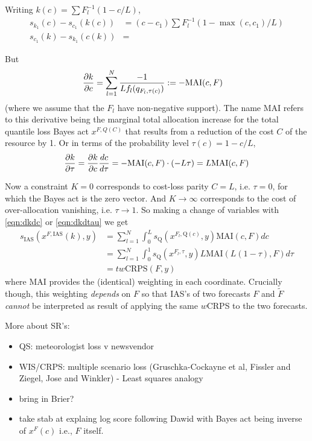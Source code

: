 \documentclass{article}
\begin{document}
Writing $k(c) = \sum F_l^{-1}(1-c/L)$,
\begin{align}
s_{k_1}(c) - s_{c_1}(k(c)) &= (c-c_1)\sum F_l^{-1}(1-\max(c,c_1)/L) \\
s_{c_1}(k) - s_{k_1}(c(k)) &=  
\end{align}


But 
\begin{align}
\frac{\partial {k} }{\partial {c}}& = \sum_{l=1}^{N} \frac{-1}{L f_l(q_{F_l,\tau(c)})} := -\mathrm{MAI}(c,F)\label{eqn:dkdc}
\end{align}
(where we assume that the $F_l$ have non-negative support). The name MAI refers to this derivative being the marginal total allocation increase for the total quantile loss Bayes act $x^{F,Q(C)}$ that results from a reduction of the cost $C$ of the resource by 1. Or in terms of the probability level $\tau(c)=1-c/L$,
\begin{align}
\frac{\partial {k} }{\partial {\tau}} = \frac{\partial {k} }{\partial {c}}\frac{d {c} }{d {\tau}} = -\mathrm{MAI}(c,F) \cdot (-L\tau) = L\mathrm{MAI}(c,F) \label{eqn:dkdtau}
\end{align}

Now a constraint $K = 0$ corresponds to cost-loss parity $C=L$, i.e. $\tau = 0$, for which the Bayes act is the zero vector.  And $K \to \infty$ corresponds to the cost of over-allocation vanishing, i.e. $\tau \to 1$. So making a change of variables with \eqref{eqn:dkdc} or \eqref{eqn:dkdtau} we get
\begin{align}
s_{\mathrm{IAS}}(x^{F, \mathrm{IAS}}(k), y) 
&= \sum_{l=1}^N \int_0^{L} s_{\mathrm{Q}}(x^{F_l, \mathrm{Q}(c)}, y) \mathrm{MAI}(c,F) dc \\
&= \sum_{l=1}^N \int_0^{1} s_{\mathrm{Q}}(x^{F_l, \tau}, y) L\mathrm{MAI}(L(1-\tau),F) d\tau \\
&= tw\mathrm{CRPS}(F,y)
\end{align}
where MAI provides the (identical) weighting in each coordinate. Crucially though, this weighting \emph{depends} on $F$ so that IAS's of two forecasts $F$ and $\tilde{F}$ \emph{cannot} be interpreted as result of applying the same $w$CRPS to the two forecasts.

More about SR's:
\begin{itemize}
\item QS: meteorologist loss v newsvendor
\item WIS/CRPS: multiple scenario loss (Gruschka-Cockayne et al, Fissler and Ziegel, Jose and Winkler)
	- Least squares analogy
\item bring in Brier?
\item take stab at explaing log score following Dawid with Bayes act being inverse of $x^F(c)$ i.e., $F$ itself.
\end{itemize}
\end{document}
